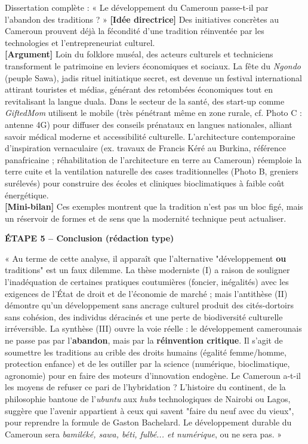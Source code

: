 \documentclass[11pt]{article}
\begin{document}
\begin{exoresolu}{Dissertation complète : « Le développement du Cameroun passe-t-il par l'abandon des traditions ? »}
\textbf{[Idée directrice]} Des initiatives concrètes au Cameroun prouvent déjà la fécondité d'une tradition réinventée par les technologies et l'entrepreneuriat culturel. \\
\textbf{[Argument]} Loin du folklore muséal, des acteurs culturels et techniciens transforment le patrimoine en leviers économiques et sociaux. La fête du \emph{Ngondo} (peuple Sawa), jadis rituel initiatique secret, est devenue un festival international attirant touristes et médias, générant des retombées économiques tout en revitalisant la langue duala. Dans le secteur de la santé, des start-up comme \emph{GiftedMom} utilisent le mobile (très pénétrant même en zone rurale, cf. Photo C : antenne 4G) pour diffuser des conseils prénataux en langues nationales, alliant savoir médical moderne et accessibilité culturelle. L'architecture contemporaine d'inspiration vernaculaire (ex. travaux de Francis Kéré au Burkina, référence panafricaine ; réhabilitation de l'architecture en terre au Cameroun) réemploie la terre cuite et la ventilation naturelle des cases traditionnelles (Photo B, greniers surélevés) pour construire des écoles et cliniques bioclimatiques à faible coût énergétique. \\
\textbf{[Mini-bilan]} Ces exemples montrent que la tradition n'est pas un bloc figé, mais un réservoir de formes et de sens que la modernité technique peut actualiser.

\textbf{ÉTAPE 5 -- Conclusion (rédaction type)}

« Au terme de cette analyse, il apparaît que l'alternative "développement \textbf{ou} traditions" est un faux dilemme. La thèse moderniste (I) a raison de souligner l'inadéquation de certaines pratiques coutumières (foncier, inégalités) avec les exigences de l'État de droit et de l'économie de marché ; mais l'antithèse (II) démontre qu'un développement sans ancrage culturel produit des cités-dortoirs sans cohésion, des individus déracinés et une perte de biodiversité culturelle irréversible. La synthèse (III) ouvre la voie réelle : le développement camerounais ne passe pas par l'\textbf{abandon}, mais par la \textbf{réinvention critique}. Il s'agit de soumettre les traditions au crible des droits humains (égalité femme/homme, protection enfance) et de les outiller par la science (numérique, bioclimatique, agronomie) pour en faire des moteurs d'innovation endogène. Le Cameroun a-t-il les moyens de refuser ce pari de l'hybridation ? L'histoire du continent, de la philosophie bantoue de l'\emph{ubuntu} aux \emph{hubs} technologiques de Nairobi ou Lagos, suggère que l'avenir appartient à ceux qui savent "faire du neuf avec du vieux", pour reprendre la formule de Gaston Bachelard. Le développement durable du Cameroun sera \emph{bamiléké, sawa, béti, fulbé... et numérique}, ou ne sera pas. »


\end{exoresolu}
\end{document}
